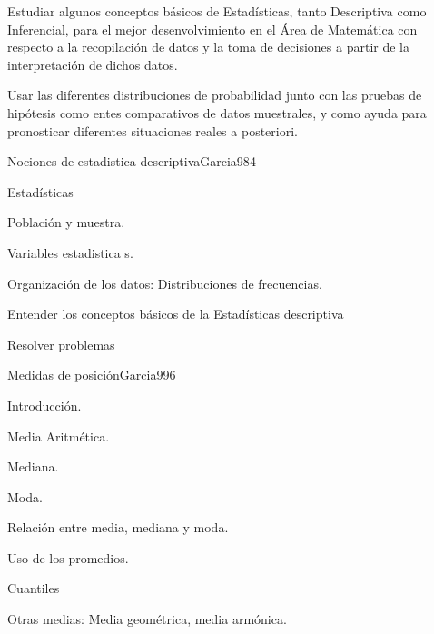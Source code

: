 \begin{syllabus}


\begin{goals}
\item  Estudiar algunos conceptos básicos de Estadísticas, tanto Descriptiva como Inferencial, para el mejor desenvolvimiento en el Área de Matemática con respecto a la recopilación de datos y la toma de decisiones a partir de la interpretación de dichos datos.
\item  Usar las diferentes distribuciones de probabilidad junto con las pruebas de hipótesis como entes comparativos de datos muestrales, y como ayuda para pronosticar diferentes situaciones reales a posteriori.
\end{goals}

\begin{outcomes}
\end{outcomes}

\begin{unit}{Nociones de estadistica  descriptiva}{Garcia98}{4}
   \begin{topics}
         \item  Estadísticas
	 \item  Población y muestra.
	 \item  Variables estadistica s.
         \item  Organización de los datos: Distribuciones de frecuencias.
   \end{topics}

   \begin{unitgoals}
         \item  Entender los conceptos básicos de la Estadísticas descriptiva
         \item  Resolver problemas
   \end{unitgoals}
\end{unit}

\begin{unit}{Medidas de posición}{Garcia99}{6}
   \begin{topics}
	\item Introducción.
	\item Media Aritmética.
	\item Mediana.
	\item Moda.
	\item Relación entre media, mediana y moda.
	\item Uso de los promedios.
	\item Cuantiles
	\item Otras medias: Media geométrica, media armónica.
   \end{topics}


\end{unit}
\end{syllabus}
